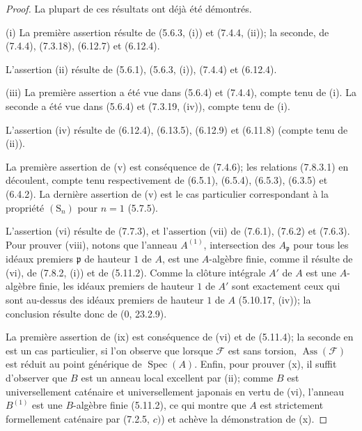 \begin{proof}
La plupart de ces résultats ont déjà été démontrés.

(i) La première assertion résulte de (5.6.3, (i)) et (7.4.4, (ii)); la seconde,
de (7.4.4), (7.3.18), (6.12.7) et (6.12.4).

L'assertion (ii) résulte de (5.6.1), (5.6.3, (i)), (7.4.4) et (6.12.4).

(iii) La première assertion a été vue dans (5.6.4) et (7.4.4), compte tenu de
(i). La seconde a été vue dans (5.6.4) et (7.3.19, (iv)), compte tenu de (i).

L'assertion (iv) résulte de (6.12.4), (6.13.5), (6.12.9) et (6.11.8) (compte
tenu de (ii)).

La première assertion de (v) est conséquence de (7.4.6); les relations
(7.8.3.1) en découlent, compte tenu respectivement de (6.5.1), (6.5.4),
(6.5.3), (6.3.5) et (6.4.2). La dernière assertion de (v) est le cas
particulier correspondant à la propriété $(\mathrm S_n)$ pour $n=1$ (5.7.5).

L'assertion (vi) résulte de (7.7.3), et l'assertion (vii) de (7.6.1), (7.6.2)
et (7.6.3). Pour prouver (viii), notons que l'anneau $A^{(1)}$, intersection
des $A_{\mathfrak p}$ pour tous les idéaux premiers $\mathfrak p$ de hauteur
$1$ de $A$, est une $A$-algèbre finie, comme il résulte de (vi), de (7.8.2,
(i)) et de (5.11.2). Comme la clôture intégrale $A'$ de $A$ est une $A$-algèbre
finie, les idéaux premiers de hauteur $1$ de $A'$ sont exactement ceux qui sont
au-dessus des idéaux premiers de hauteur $1$ de $A$ (5.10.17, (iv)); la
conclusion résulte donc de (0, 23.2.9).

La première assertion de (ix) est conséquence de (vi) et de (5.11.4); la
seconde en est un cas particulier, si l'on observe que lorsque $\mathcal F$ est
sans torsion, $\operatorname{Ass}(\mathcal F)$ est réduit au point générique de
$\operatorname{Spec}(A)$. Enfin, pour prouver (x), il suffit d'observer que $B$
est un anneau local excellent par (ii); comme $B$ est universellement caténaire
et universellement japonais en vertu de (vi), l'anneau $B^{(1)}$ est une
$B$-algèbre finie (5.11.2), ce qui montre que $A$ est strictement formellement
caténaire par (7.2.5, $c)$) et achève la démonstration de (x).
\end{proof}


